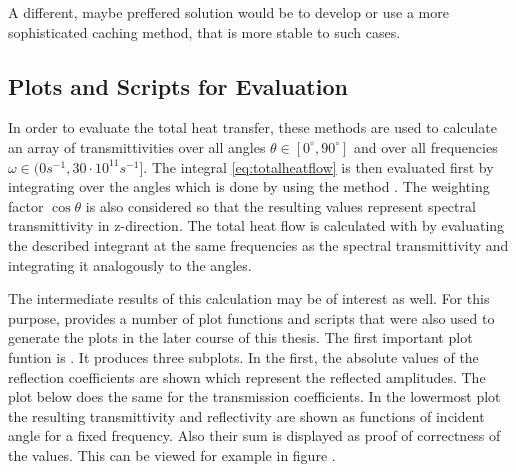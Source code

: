 A different, maybe preffered solution would be to develop or use a more
sophisticated caching method, that is more stable to such cases.



\subsection{Plots and Scripts for Evaluation}
In order to evaluate the total heat transfer, these methods are used to
calculate an array of transmittivities over all angles
$\theta\in[0^{\circ},90^{\circ}]$ and over all frequencies
$\omega \in (0\si{s^{-1}}, 30\cdot 10^{11}\si{s^{-1}}] $. The integral
\ref{eq:totalheatflow} is then evaluated first by integrating over the angles
which is done by  using the method
. The weighting factor $\cos \theta$ is also considered so
that the resulting values represent spectral transmittivity in z-direction.
The total heat flow is calculated with  by evaluating
the described integrant at the same frequencies as the spectral transmittivity
and integrating it analogously to the angles. 

The intermediate results of this calculation may be of interest as well. For
this purpose,  provides a number of plot functions and
scripts that were also used to generate the plots in the later course of this
thesis. The first important plot funtion is .
It produces three subplots. In the first, the absolute values of the reflection
coefficients are shown which represent the reflected amplitudes. The plot below
does the same for the transmission coefficients. In the lowermost plot the
resulting transmittivity and reflectivity are shown as functions of
incident angle for a fixed frequency. Also their sum is displayed as proof of
correctness of the values. This can be viewed for example in figure
.

